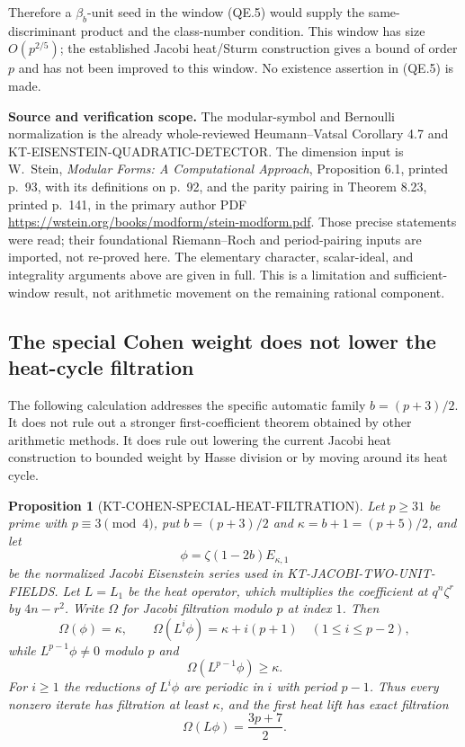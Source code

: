 \documentclass[11pt,a4paper]{article}
\newtheorem{proposition}[theorem]{Proposition}
\theoremstyle{definition}
\renewcommand{\paragraph}[1]{\par\smallskip\noindent\textbf{#1}\quad\ignorespaces}
\begin{document}
Therefore a $\beta_b$-unit seed in the window (QE.5) would supply
the same-discriminant product and the class-number condition.
This window has size $O(p^{2/5})$; the established Jacobi
heat/Sturm construction gives a bound of order $p$ and has not
been improved to this window.  No existence assertion in (QE.5)
is made.

\paragraph{Source and verification scope.}
The modular-symbol and Bernoulli normalization is the already
whole-reviewed Heumann--Vatsal Corollary 4.7 and
KT-EISENSTEIN-QUADRATIC-DETECTOR.  The dimension input is
W.~Stein, \emph{Modular Forms: A Computational Approach},
Proposition 6.1, printed p.~93, with its definitions on p.~92,
and the parity pairing in Theorem 8.23, printed p.~141,
in the primary author PDF
\url{https://wstein.org/books/modform/stein-modform.pdf}.
Those precise statements were read; their foundational
Riemann--Roch and period-pairing inputs are imported,
not re-proved here.
The elementary character, scalar-ideal, and integrality
arguments above are given in full.  This is a limitation and
sufficient-window result, not arithmetic movement on the
remaining rational component.



\subsection{The special Cohen weight does not lower the heat-cycle filtration}

The following calculation addresses the specific automatic family
$b=(p+3)/2$.  It does not rule out a stronger first-coefficient
theorem obtained by other arithmetic methods.  It does rule out
lowering the current Jacobi heat construction to bounded weight
by Hasse division or by moving around its heat cycle.

\begin{proposition}[KT-COHEN-SPECIAL-HEAT-FILTRATION]
Let $p\geq31$ be prime with $p\equiv3\pmod4$, put
$b=(p+3)/2$ and $\kappa=b+1=(p+5)/2$, and let
\[
 \phi=\zeta(1-2b)E_{\kappa,1}
\]
be the normalized Jacobi Eisenstein series used in
KT-JACOBI-TWO-UNIT-FIELDS.  Let $L=L_1$ be the heat operator,
which multiplies the coefficient at $q^n\zeta^r$ by $4n-r^2$.
Write $\Omega$ for Jacobi filtration modulo $p$ at index $1$.
Then
\[
 \Omega(\phi)=\kappa,\qquad
 \Omega(L^i\phi)=\kappa+i(p+1)\quad(1\leq i\leq p-2),
 \tag{HC.1}
\]
while $L^{p-1}\phi\ne0$ modulo $p$ and
\[
 \Omega(L^{p-1}\phi)\geq\kappa.
 \tag{HC.2}
\]
For $i\geq1$ the reductions of $L^i\phi$ are periodic in $i$
with period $p-1$.  Thus every nonzero iterate has filtration
at least $\kappa$, and the first heat lift has exact filtration
\[
 \Omega(L\phi)=\frac{3p+7}{2}.
 \tag{HC.3}
\]
\end{proposition}
\end{document}
